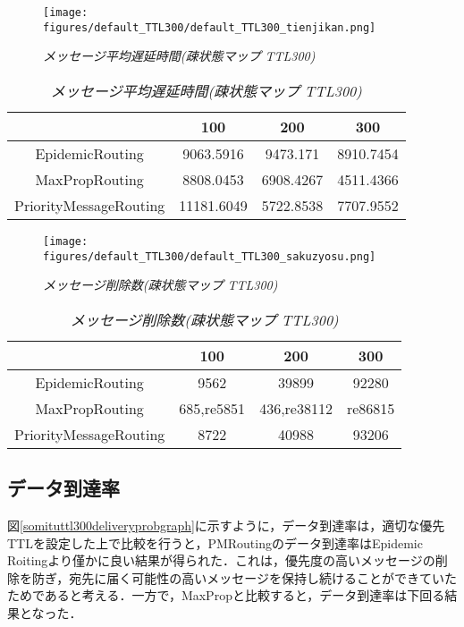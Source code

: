 \documentclass[11pt]{icsthesis}
\begin{document}
\newpage

\begin{figure}[h]
\centering
\texttt{[image: figures/default\_TTL300/default\_TTL300\_tienjikan.png]}
\caption[]{\it{メッセージ平均遅延時間(疎状態マップ TTL300)}}
\label{somituttl300latencyavggraph}
\end{figure}

\begin{table}[H]
 \begin{center}
      \caption[]{\it{メッセージ平均遅延時間(疎状態マップ TTL300)}}
      \label{somituTtl300latencyavg}
      \begin{tabular}{|c|c|c|c|}
\hline
&100&200&300\\
\hline
EpidemicRouting&9063.5916&9473.171&8910.7454\\
\hline
MaxPropRouting&8808.0453&6908.4267&4511.4366\\
\hline
PriorityMessageRouting&11181.6049&5722.8538&7707.9552\\
\hline
      \end{tabular}
    \end{center}
\end{table}

\begin{figure}[h]
\centering
\texttt{[image: figures/default\_TTL300/default\_TTL300\_sakuzyosu.png]}
\caption[]{\it{メッセージ削除数(疎状態マップ TTL300)}}
\label{somituttl300droppedgraph}
\end{figure}

\begin{table}[H]
 \begin{center}
      \caption[]{\it{メッセージ削除数(疎状態マップ TTL300)}}
      \label{somituTtl300dropped}
      \begin{tabular}{|c|c|c|c|}
\hline
&100&200&300\\
\hline
EpidemicRouting&9562&39899&92280\\
\hline
MaxPropRouting&685,re5851&436,re38112&re86815\\
\hline
PriorityMessageRouting&8722&40988&93206\\
\hline
      \end{tabular}
    \end{center}
\end{table}

\subsection{データ到達率}
図\ref{somituttl300deliveryprobgraph}に示すように，データ到達率は，適切な優先TTLを設定した上で比較を行うと，PMRoutingのデータ到達率はEpidemic Roitingより僅かに良い結果が得られた．これは，優先度の高いメッセージの削除を防ぎ，宛先に届く可能性の高いメッセージを保持し続けることができていたためであると考える．一方で，MaxPropと比較すると，データ到達率は下回る結果となった．\\
\end{document}
